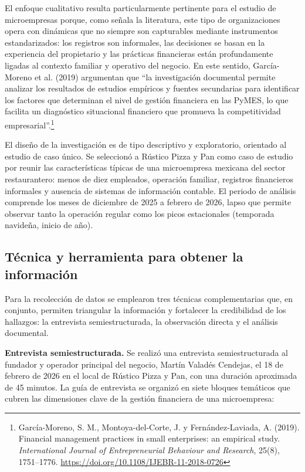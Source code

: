 \documentclass[12pt,letterpaper]{article}
\begin{document}
El enfoque cualitativo resulta particularmente pertinente para el estudio de microempresas porque, como señala la literatura, este tipo de organizaciones opera con dinámicas que no siempre son capturables mediante instrumentos estandarizados: los registros son informales, las decisiones se basan en la experiencia del propietario y las prácticas financieras están profundamente ligadas al contexto familiar y operativo del negocio. En este sentido, García-Moreno et al. (2019) argumentan que ``la investigación documental permite analizar los resultados de estudios empíricos y fuentes secundarias para identificar los factores que determinan el nivel de gestión financiera en las PyMES, lo que facilita un diagnóstico situacional financiero que promueva la competitividad empresarial''.\footnote{García-Moreno, S. M., Montoya-del-Corte, J. y Fernández-Laviada, A. (2019). Financial management practices in small enterprises: an empirical study. \textit{International Journal of Entrepreneurial Behaviour and Research}, 25(8), 1751--1776. \url{https://doi.org/10.1108/IJEBR-11-2018-0726}}

El diseño de la investigación es de tipo descriptivo y exploratorio, orientado al estudio de caso único. Se seleccionó a Rústico Pizza y Pan como caso de estudio por reunir las características típicas de una microempresa mexicana del sector restaurantero: menos de diez empleados, operación familiar, registros financieros informales y ausencia de sistemas de información contable. El periodo de análisis comprende los meses de diciembre de 2025 a febrero de 2026, lapso que permite observar tanto la operación regular como los picos estacionales (temporada navideña, inicio de año).

\subsection{Técnica y herramienta para obtener la información}

Para la recolección de datos se emplearon tres técnicas complementarias que, en conjunto, permiten triangular la información y fortalecer la credibilidad de los hallazgos: la entrevista semiestructurada, la observación directa y el análisis documental.

\textbf{Entrevista semiestructurada.} Se realizó una entrevista semiestructurada al fundador y operador principal del negocio, Martín Valadés Cendejas, el 18 de febrero de 2026 en el local de Rústico Pizza y Pan, con una duración aproximada de 45 minutos. La guía de entrevista se organizó en siete bloques temáticos que cubren las dimensiones clave de la gestión financiera de una microempresa:
\end{document}
